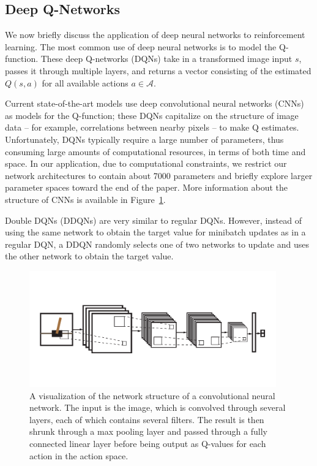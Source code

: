 \documentclass[11pt]{article}
\begin{document}
\subsection{Deep Q-Networks}

We now briefly discuss the application of deep neural networks to reinforcement learning. The most common use of deep neural networks is to model the Q-function. These deep Q-networks (DQNs) take in a transformed image input $s$, passes it through multiple layers, and returns a vector consisting of the estimated $Q(s, a)$ for all available actions $a \in \mathcal{A}$. 

Current state-of-the-art models \cite{mnih2013playing, mnih2015human} use deep convolutional neural networks (CNNs) as models for the Q-function; these DQNs capitalize on the structure of image data -- for example, correlations between nearby pixels -- to make Q estimates. Unfortunately, DQNs typically require a large number of parameters, thus consuming large amounts of computational resources, in terms of both time and space. In our application, due to computational constraints, we restrict our network architectures to contain about 7000 parameters and briefly explore larger parameter spaces toward the end of the paper. More information about the structure of CNNs is available in Figure~\ref{fig:cnn}.

Double DQNs (DDQNs) \cite{van2016deep} are very similar to regular DQNs. However, instead of using the same network to obtain the target value for minibatch updates as in a regular DQN, a DDQN randomly selects one of two networks to update and uses the other network to obtain the target value.

\begin{figure}
    \centering
    \includegraphics[trim={0 1cm 0 1cm}, clip, width=0.95\textwidth]{cnn.pdf}
    \caption{A visualization of the network structure of a convolutional neural network. The input is the image, which is convolved through several layers, each of which contains several filters. The result is then shrunk through a max pooling layer and passed through a fully connected linear layer before being output as Q-values for each action in the action space.}
    \label{fig:cnn}
\end{figure}
\end{document}
